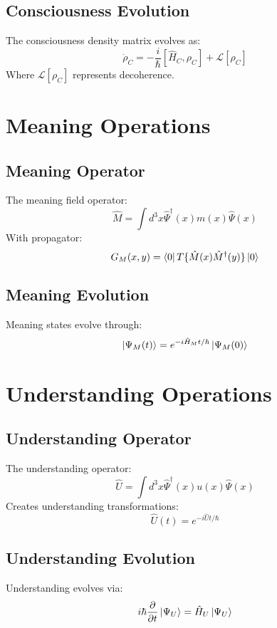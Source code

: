 \documentclass[12pt]{article}
\begin{document}
\subsection{Consciousness Evolution}
The consciousness density matrix evolves as:
\begin{equation}
\dot{\rho}_C = -\frac{i}{\hbar}[\hat{H}_C,\rho_C] + \mathcal{L}[\rho_C]
\end{equation}
Where $\mathcal{L}[\rho_C]$ represents decoherence.
\section{Meaning Operations}
\subsection{Meaning Operator}
The meaning field operator:
\begin{equation}
\hat{M} = \int d^3x \hat{\Psi}^\dagger(x)m(x)\hat{\Psi}(x)
\end{equation}
With propagator:
\begin{equation}
G_M(x,y) = \bra{0}T\{\hat{M}(x)\hat{M}^\dagger(y)\}\ket{0}
\end{equation}
\subsection{Meaning Evolution}
Meaning states evolve through:
\begin{equation}
\ket{\Psi_M(t)} = e^{-i\hat{H}_Mt/\hbar}\ket{\Psi_M(0)}
\end{equation}
\section{Understanding Operations}
\subsection{Understanding Operator}
The understanding operator:
\begin{equation}
\hat{U} = \int d^3x \hat{\Psi}^\dagger(x)u(x)\hat{\Psi}(x)
\end{equation}
Creates understanding transformations:
\begin{equation}
\hat{U}(t) = e^{-i\hat{U}t/\hbar}
\end{equation}
\subsection{Understanding Evolution}
Understanding evolves via:
\begin{equation}
i\hbar\frac{\partial}{\partial t}\ket{\Psi_U} = \hat{H}_U\ket{\Psi_U}
\end{equation}
\end{document}
